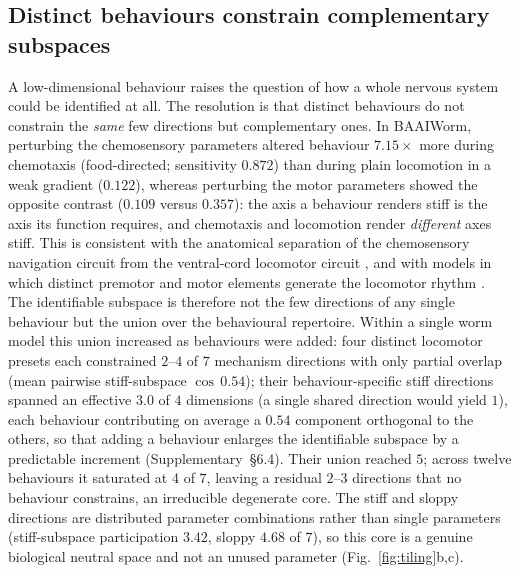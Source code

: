 \documentclass[11pt]{article}
\begin{document}
\subsection*{Distinct behaviours constrain complementary subspaces}
A low-dimensional behaviour raises the question of how a whole nervous system could be identified at all. The resolution is that distinct behaviours do not constrain the \emph{same} few directions but complementary ones. In BAAIWorm, perturbing the chemosensory parameters altered behaviour $7.15\times$ more during chemotaxis (food-directed; sensitivity $0.872$) than during plain locomotion in a weak gradient ($0.122$), whereas perturbing the motor parameters showed the opposite contrast ($0.109$ versus $0.357$): the axis a behaviour renders stiff is the axis its function requires, and chemotaxis and locomotion render \emph{different} axes stiff. This is consistent with the anatomical separation of the chemosensory navigation circuit from the ventral-cord locomotor circuit \citep{gray2005circuit,bargmann2012beyond}, and with models in which distinct premotor and motor elements generate the locomotor rhythm \citep{wen2012proprioceptive,fouad2018distributed,gao2018excitatory,boyle2012gait,izquierdo2018connecting,rakowski2017optimal}. The identifiable subspace is therefore not the few directions of any single behaviour but the union over the behavioural repertoire. Within a single worm model this union increased as behaviours were added: four distinct locomotor presets each constrained $2$--$4$ of $7$ mechanism directions with only partial overlap (mean pairwise stiff-subspace $\cos\,0.54$); their behaviour-specific stiff directions spanned an effective $3.0$ of $4$ dimensions (a single shared direction would yield $1$), each behaviour contributing on average a $0.54$ component orthogonal to the others, so that adding a behaviour enlarges the identifiable subspace by a predictable increment (Supplementary~\S6.4). Their union reached $5$; across twelve behaviours it saturated at $4$ of $7$, leaving a residual $2$--$3$ directions that no behaviour constrains, an irreducible degenerate core. The stiff and sloppy directions are distributed parameter combinations rather than single parameters (stiff-subspace participation $3.42$, sloppy $4.68$ of $7$), so this core is a genuine biological neutral space and not an unused parameter (Fig.~\ref{fig:tiling}b,c).
\end{document}
